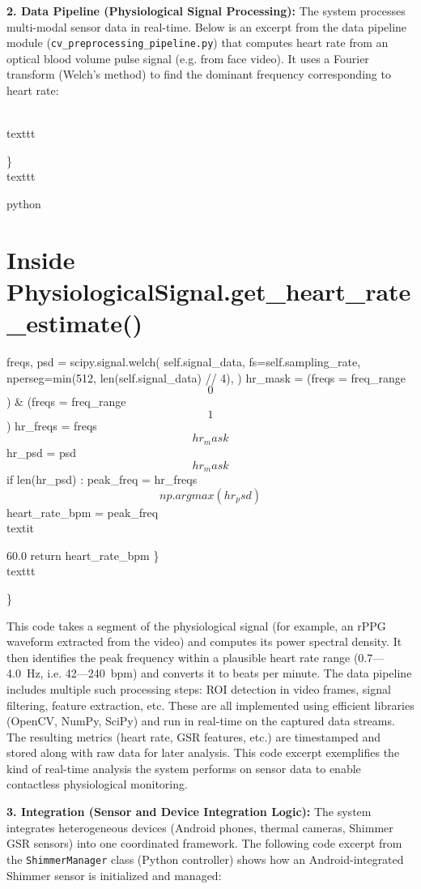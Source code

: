 {\textbf{2. Data Pipeline (Physiological Signal Processing):} The system
processes multi-modal sensor data in real-time. Below is an excerpt from
the data pipeline module (\texttt{cv_preprocessing_pipeline.py}) that computes
heart rate from an optical blood volume pulse signal (e.g. from face
video). It uses a Fourier transform (Welch's method) to find the
dominant frequency corresponding to heart
rate\cite{DeviceServer}:

\\texttt{\}\\texttt{python

\chapter{Inside PhysiologicalSignal.get_heart_rate_estimate()}

freqs, psd = scipy.signal.welch( self.signal_data,
fs=self.sampling_rate, nperseg=min(512, len(self.signal_data) // 4), )
hr_mask = (freqs \>= freq_range\[0\]) & (freqs \<= freq_range\[1\])
hr_freqs = freqs\[hr_mask\] hr_psd = psd\[hr_mask\] if len(hr_psd) :
peak_freq = hr_freqs\[np.argmax(hr_psd)\] heart_rate_bpm = peak_freq \\textit{
60.0 return heart_rate_bpm
\}\\texttt{\}\cite{DeviceServer}

This code takes a segment of the physiological signal (for example, an
rPPG waveform extracted from the video) and computes its power spectral
density. It then identifies the peak frequency within a plausible heart
rate range (0.7---4.0 Hz, i.e. 42---240 bpm) and converts it to beats per
minute. The data pipeline includes multiple such processing steps: ROI
detection in video frames, signal filtering, feature extraction, etc.
These are all implemented using efficient libraries (OpenCV, NumPy,
SciPy) and run in real-time on the captured data streams. The resulting
metrics (heart rate, GSR features, etc.) are timestamped and stored
along with raw data for later analysis. This code excerpt exemplifies
the kind of real-time analysis the system performs on sensor data to
enable contactless physiological monitoring.

\textbf{3. Integration (Sensor and Device Integration Logic):} The system
integrates heterogeneous devices (Android phones, thermal cameras,
Shimmer GSR sensors) into one coordinated framework. The following code
excerpt from the \texttt{ShimmerManager} class (Python controller) shows how an
Android-integrated Shimmer sensor is initialized and
managed\cite{DeviceServer}\cite{DeviceServer}:

}}}}}
